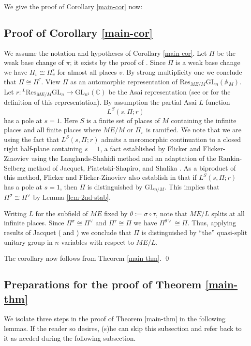 \documentclass[12pt]{amsart}
\theoremstyle{remark}
\numberwithin{equation}{section}
\newcommand{\A}{\mathbb{A}}
\newcommand{\GL}{\mathrm{GL}}
\newcommand{\CC}{\mathbb{C}}
\theoremstyle{definition}
\numberwithin{equation}{subsection}
\newcommand{\Res}{\mathrm{Res}}
\begin{document}
We  give the proof of Corollary \ref{main-cor} now:

\subsection{Proof of Corollary \ref{main-cor}} \label{ssec-main-cor}
We assume the notation and hypotheses of Corollary \ref{main-cor}. Let $\Pi$ be the weak base change of $\pi$; it exists by the proof of \cite[Theorem 3.1.4]{HarLab}.  Since $\Pi$ is a weak base change we have  $\Pi_v\cong \Pi^{\tau}_v$ for almost all places $v$.
By strong multiplicity one we conclude that
$\Pi
\cong \Pi^{\tau}$.  View $\Pi$ as an automorphic representation of $\Res_{ME/M}\GL_n(\A_M)$.
Let $r:{}^{L}\mathrm{Res}_{ME/M} \GL_n \to \GL_{n^2}(\CC)$ be the Asai
representation (see \cite[\S 6]{Ramakrishnan} or \cite{FlickerTwTen} for the
definition of this representation).  By assumption the partial Asai $L$-function
$$
L^S(s,\Pi;r)
$$
has a pole at $s=1$.  Here $S$ is a finite set of places of $M$ containing the infinite places and all finite places
where $ME/M$ or $\Pi_v$ is ramified.  We note that we are using the fact that $L^S(s,\Pi;r)$ admits
a meromorphic continuation to a closed right half-plane containing $s=1$, a fact established by
Flicker and Flicker-Zinoviev \cite{FlickerTwTen} \cite[Theorem]{FlickerZin} using the
Langlands-Shahidi  method \cite{Shahidi} and an adaptation of the Rankin-Selberg method of Jacquet,
Piatetski-Shapiro, and Shalika \cite{JPSS}. As a biproduct of this method,
Flicker and Flicker-Zinoviev also establish in \cite[Theorem]{FlickerZin} that if $L^S(s,\Pi;r)$ has
a pole at $s=1$, then $\Pi$ is distinguished by $\GL_{n/M}$.  This implies that $\Pi^{\sigma} \cong \Pi^{\vee}$ by Lemma \ref{lem-2nd-stab}.


Writing $L$ for the subfield of $ME$ fixed by $\theta:=\sigma \circ \tau$,
note that $ME/L$ splits at all infinite places.  Since $\Pi^{\sigma} \cong \Pi^{\vee}$ and $\Pi^{\tau} \cong \Pi$ we have $\Pi^{\theta \vee} \cong \Pi$. Thus, applying results of Jacquet (\cite[Theorem 3 and 4]{JacquetKlII} and \cite{Jacquetqs})
we conclude that $\Pi$ is distinguished by ``the'' quasi-split unitary group in $n$-variables with respect to $ME/L$.

The corollary now follows from Theorem \ref{main-thm}. \qed


\subsection{Preparations for the proof of Theorem \ref{main-thm}}
\label{ssec-preps}
We isolate three steps in
the proof of Theorem \ref{main-thm} in the following lemmas.  If the reader so
desires, (s)he can skip this subsection and refer back to it as needed during the
following subsection.
\end{document}
